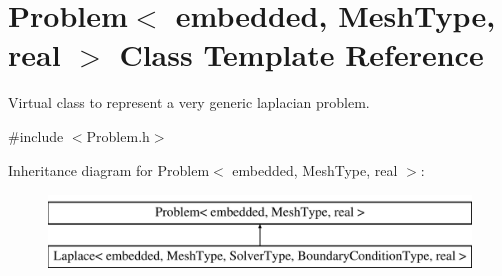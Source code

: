 \hypertarget{class_problem}{}\section{Problem$<$ embedded, Mesh\+Type, real $>$ Class Template Reference}
\label{class_problem}


Virtual class to represent a very generic laplacian problem.  




{\ttfamily \#include $<$Problem.\+h$>$}

Inheritance diagram for Problem$<$ embedded, Mesh\+Type, real $>$\+:\begin{figure}[H]
\begin{center}
\leavevmode
\includegraphics[height=2.000000cm]{class_problem}
\end{center}
\end{figure}
